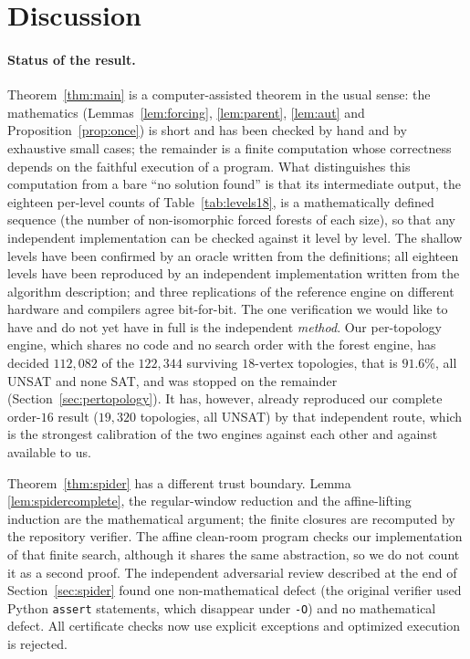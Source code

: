 \documentclass[11pt,a4paper]{article}
\theoremstyle{plain}
\theoremstyle{remark}
\newcommand{\file}[1]{\texttt{#1}}
\begin{document}
\section{Discussion}\label{sec:discussion}

\paragraph{Status of the result.}
Theorem~\ref{thm:main} is a computer-assisted theorem in the usual sense: the
mathematics (Lemmas~\ref{lem:forcing}, \ref{lem:parent}, \ref{lem:aut} and
Proposition~\ref{prop:once}) is short and has been checked by hand and by
exhaustive small cases; the remainder is a finite computation whose correctness
depends on the faithful execution of a program.  What distinguishes this
computation from a bare ``no solution found'' is that its intermediate
output, the eighteen per-level counts of Table~\ref{tab:levels18}, is a
mathematically defined sequence (the number of non-isomorphic forced forests of
each size), so that any independent implementation can be checked against it
level by level.  The shallow levels have been confirmed by an oracle written
from the definitions; all eighteen levels have been reproduced by an independent
implementation written from the algorithm description; and three replications
of the reference engine on different hardware and compilers agree bit-for-bit.
The one verification we would like to have and do not yet have in full is the
independent \emph{method}.  Our per-topology engine, which shares no code and
no search order with the forest engine, has decided $112{,}082$ of the $122{,}344$
surviving $18$-vertex topologies, that is $91.6\%$, all UNSAT and none SAT, and
was stopped on the remainder (Section~\ref{sec:pertopology}).  It has, however,
already reproduced our complete order-$16$ result ($19{,}320$ topologies, all
UNSAT) by that independent route, which is the strongest calibration of the two
engines against each other and against \cite{Calhoun2007} available to us.

Theorem~\ref{thm:spider} has a different trust boundary.  Lemma
\ref{lem:spidercomplete}, the regular-window reduction and the affine-lifting
induction are the mathematical argument; the finite closures are recomputed by
the repository verifier.  The affine clean-room program checks our
implementation of that finite search, although it shares the same abstraction,
so we do not count it as a second proof.  The independent adversarial review described at
the end of Section~\ref{sec:spider} found one non-mathematical defect (the
original verifier used Python \file{assert} statements, which disappear under
\file{-O}) and no mathematical defect.  All certificate checks now use
explicit exceptions and optimized execution is rejected.
\end{document}
